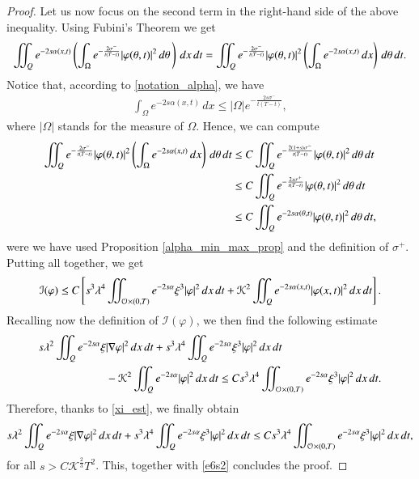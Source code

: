 \documentclass[preprint,1p]{elsarticle}
\newcommand{\intd}{\displaystyle\int \kern -7pt \int}
\begin{document}
\begin{proof}
Let us now focus on the second term in the right-hand side of the above inequality. Using Fubini's Theorem we get
\begin{align*}
	\intd_Q e^{-2s\alpha(x,t)} \left(\int_{\Omega} e^{-\frac{2\sigma^-}{t(T-t)}}|\varphi(\theta,t)|^2\,d\theta\,\right)\,dx\,dt = \intd_Q e^{-\frac{2\sigma^-}{t(T-t)}}|\varphi(\theta,t)|^2\left(\int_\Omega e^{-2s\alpha(x,t)}\,dx\right)\,d\theta\,dt.
\end{align*}
Notice that, according to \eqref{notation_alpha}, we have
\begin{align*}
	\int_\Omega e^{-2s\alpha(x,t)}\,dx \leq |\Omega| e^{-\frac{2s\sigma^-}{t(T-t)}},
\end{align*}
where $|\Omega|$ stands for the measure of $\Omega$. Hence, we can compute
\begin{align*}
	\intd_Q e^{-\frac{2\sigma^-}{t(T-t)}}|\varphi(\theta,t)|^2\left(\int_\Omega e^{-2s\alpha(x,t)}\,dx\right)\,d\theta\,dt &\leq C \intd_Q e^{-\frac{2(1+s)\sigma^-}{t(T-t)}}|\varphi(\theta,t)|^2\,d\theta\,dt
	\\
	&\leq C\intd_Q e^{-\frac{2s\sigma^+}{t(T-t)}}|\varphi(\theta,t)|^2\,d\theta\,dt 
	\\
	&\leq C \intd_Q e^{-2s\alpha(\theta,t)}|\varphi(\theta,t)|^2\,d\theta\,dt,
\end{align*}	
were we have used Proposition \ref{alpha_min_max_prop} and the definition of $\sigma^+$. Putting all together, we get
\begin{align*}
	\mathcal{I}(\varphi) \leq C \left[s^3\lambda^4\intd_{\mathcal O\times(0,T)} e^{-2s\alpha}\xi^3 |\varphi|^2\,dx\,dt + \mathcal{K}^2\intd_Q e^{-2s\alpha(x,t)}|\varphi(x,t)|^2\,dx\,dt\right].
\end{align*}
Recalling now the definition of $\mathcal{I}(\varphi)$, we then find the following estimate
\begin{align}\label{carleman_prel3}
	s\lambda^2\intd_Q e^{-2s\alpha}\xi & |\nabla \varphi|^2\,dx\,dt + s^3\lambda^4\intd_Q e^{-2s\alpha}\xi^3|\varphi|^2\,dx\,dt \notag
	\\
	&- \mathcal{K}^2\intd_Q e^{-2s\alpha}|\varphi|^2\,dx\,dt \leq C s^3\lambda^4\intd_{\mathcal O\times(0,T)} e^{-2s\alpha}\xi^3 |\varphi|^2\,dx\,dt.
\end{align}
Therefore, thanks to \eqref{xi_est}, we finally obtain
\begin{align*}
	s\lambda^2\intd_Q e^{-2s\alpha}\xi |\nabla \varphi|^2\,dx\,dt + s^3\lambda^4\intd_Q e^{-2s\alpha}\xi^3|\varphi|^2\,dx\,dt \leq C s^3\lambda^4\intd_{\mathcal O\times(0,T)} e^{-2s\alpha}\xi^3 |\varphi|^2\,dx\,dt,
\end{align*}
for all $s>C\mathcal{K}^{\frac 23}T^2$. This, together with \eqref{e6s2} concludes the proof.
\end{proof}
\end{document}
